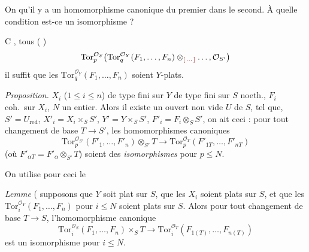 \documentclass[11pt,a4paper]{article}
\begin{document}
On  qu'il y a un homomorphisme canonique du premier dans
le second. À quelle condition est-ce un isomorphisme ?

C\struck{\ill{} \ill{} \ill{} \ill{} \ill{} \ill{} \ill{}} \ill{},
  tous (\ill{} \ill{} \ill{} \ill{})
\[
  \mathrm{Tor}_p^{\mathcal{O}_S}\bigl(\mathrm{Tor}_q^{\mathcal{O}_Y}(F_1, \ldots, F_n)
  \otimes_{\ill{}} \ldots, \mathcal{O}_{S'}\bigr)
\]
il suffit que les $\mathrm{Tor}_q^{\mathcal{O}_Y}(F_1, \ldots, F_n)$
soient $Y$-plats.

\emph{Proposition.} $X_i$ ($1 \le i \le n$) de type fini sur $Y$ de type
fini sur $S$ noeth., $F_i$ coh.\ sur $X_i$, $N$ un entier. Alors il existe
un  ouvert non vide $U$ de $S$, tel que,
  $S' = U_{\mathrm{red}}$, $X'_i = X_i \times_S S'$,
$Y' = Y \times_S S'$, $F'_i = F_i \otimes_S S'$, on ait ceci : pour tout
changement de base $T \to S'$, les homomorphismes canoniques
\[
  \mathrm{Tor}_p^{\mathcal{O}_{S'}}(F'_1, \ldots, F'_n) \otimes_{S'} T
  \longrightarrow
  \mathrm{Tor}_p^{\mathcal{O}_T}(F'_{1T}, \ldots, F'_{nT})
\]
(où $F'_{\alpha T} = F'_\alpha \otimes_{S'} T$) soient des
\emph{isomorphismes} pour $p \le N$.

On utilise pour ceci le

\emph{Lemme} ( supposons que $Y$ soit plat sur $S$, que les $X_i$ soient
plats sur $S$, et que les
$\mathrm{Tor}_i^{\mathcal{O}_Y}(F_1, \ldots, F_n)$ pour $i \le N$ soient
plats sur $S$. Alors pour tout changement de base $T \to S$,
l'homomorphisme canonique
\[
  \mathrm{Tor}_i^{\mathcal{O}_S}(F_1, \ldots, F_n) \times_S T \longrightarrow
  \mathrm{Tor}_i^{\mathcal{O}_T}(F_{1(T)}, \ldots, F_{n(T)})
\]
est un isomorphisme pour $i \le N$.
\end{document}
